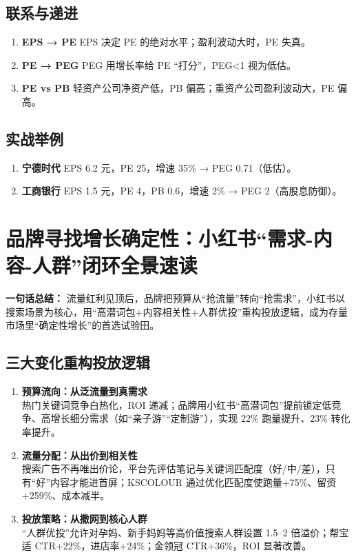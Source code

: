 \subsection{联系与递进}
\begin{enumerate}[leftmargin=*, nosep]
    \item \textbf{EPS → PE}  
    EPS 决定 PE 的绝对水平；盈利波动大时，PE 失真。
    \item \textbf{PE → PEG}  
    PEG 用增长率给 PE “打分”，PEG<1 视为低估。
    \item \textbf{PE vs PB}  
    轻资产公司净资产低，PB 偏高；重资产公司盈利波动大，PE 偏高。
\end{enumerate}

\subsection{实战举例}
\begin{enumerate}[leftmargin=*, nosep]
    \item \textbf{宁德时代}  
    EPS 6.2 元，PE 25，增速 35\% → PEG 0.71（低估）。  
    \item \textbf{工商银行}  
    EPS 1.5 元，PE 4，PB 0.6，增速 2\% → PEG 2（高股息防御）。  
\end{enumerate}

\clearpage

\section{品牌寻找增长确定性：小红书“需求-内容-人群”闭环全景速读}
\textbf{一句话总结：}  
流量红利见顶后，品牌把预算从“抢流量”转向“抢需求”，{\color{red}小红书以搜索场景为核心，用“高潜词包+内容相关性+人群优投”重构投放逻辑}，成为存量市场里“确定性增长”的首选试验田。

\subsection{三大变化重构投放逻辑}
\begin{enumerate}[leftmargin=*, nosep]
    \item \textbf{预算流向：从泛流量到真需求}  \\
    热门关键词竞争白热化，ROI 递减；品牌用小红书“高潜词包”提前锁定低竞争、高增长细分需求（如“亲子游”“定制游”），实现 22\% 跑量提升、23\% 转化率提升。
    
    \item \textbf{流量分配：从出价到相关性}  \\
    搜索广告不再唯出价论，平台先评估笔记与关键词匹配度（好/中/差），只有“好”内容才能进首屏；KSCOLOUR 通过优化匹配度使跑量+75\%、留资+259\%、成本减半。
    
    \item \textbf{投放策略：从撒网到核心人群}  \\
    “人群优投”允许对孕妈、新手妈妈等高价值搜索人群设置 1.5–2 倍溢价；帮宝适 CTR+22\%，进店率+24\%；金领冠 CTR+36\%，ROI 显著改善。
\end{enumerate}

